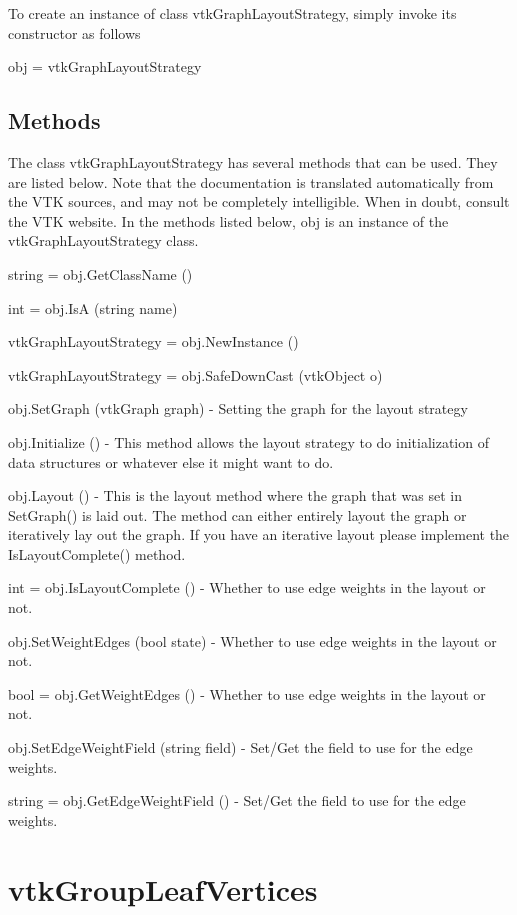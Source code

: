 To create an instance of class vtk\-Graph\-Layout\-Strategy, simply invoke its constructor as follows \begin{DoxyVerb}  obj = vtkGraphLayoutStrategy
\end{DoxyVerb}
 \hypertarget{vtkwidgets_vtkxyplotwidget_Methods}{}\subsection{Methods}\label{vtkwidgets_vtkxyplotwidget_Methods}
The class vtk\-Graph\-Layout\-Strategy has several methods that can be used. They are listed below. Note that the documentation is translated automatically from the V\-T\-K sources, and may not be completely intelligible. When in doubt, consult the V\-T\-K website. In the methods listed below, {\ttfamily obj} is an instance of the vtk\-Graph\-Layout\-Strategy class. 
\begin{DoxyItemize}
\item {\ttfamily string = obj.\-Get\-Class\-Name ()}  
\item {\ttfamily int = obj.\-Is\-A (string name)}  
\item {\ttfamily vtk\-Graph\-Layout\-Strategy = obj.\-New\-Instance ()}  
\item {\ttfamily vtk\-Graph\-Layout\-Strategy = obj.\-Safe\-Down\-Cast (vtk\-Object o)}  
\item {\ttfamily obj.\-Set\-Graph (vtk\-Graph graph)} -\/ Setting the graph for the layout strategy  
\item {\ttfamily obj.\-Initialize ()} -\/ This method allows the layout strategy to do initialization of data structures or whatever else it might want to do.  
\item {\ttfamily obj.\-Layout ()} -\/ This is the layout method where the graph that was set in Set\-Graph() is laid out. The method can either entirely layout the graph or iteratively lay out the graph. If you have an iterative layout please implement the Is\-Layout\-Complete() method.  
\item {\ttfamily int = obj.\-Is\-Layout\-Complete ()} -\/ Whether to use edge weights in the layout or not.  
\item {\ttfamily obj.\-Set\-Weight\-Edges (bool state)} -\/ Whether to use edge weights in the layout or not.  
\item {\ttfamily bool = obj.\-Get\-Weight\-Edges ()} -\/ Whether to use edge weights in the layout or not.  
\item {\ttfamily obj.\-Set\-Edge\-Weight\-Field (string field)} -\/ Set/\-Get the field to use for the edge weights.  
\item {\ttfamily string = obj.\-Get\-Edge\-Weight\-Field ()} -\/ Set/\-Get the field to use for the edge weights.  
\end{DoxyItemize}\hypertarget{vtkinfovis_vtkgroupleafvertices}{}\section{vtk\-Group\-Leaf\-Vertices}\label{vtkinfovis_vtkgroupleafvertices}

